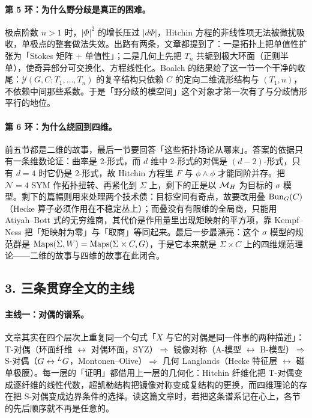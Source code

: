 \paragraph{第 5 环：为什么野分歧是真正的困难。}
极点阶数 $n>1$ 时，$|\Phi|^{2}$ 的增长压过 $|d\Phi|$，Hitchin 方程的非线性项无法被微扰吸收，单极点的整套做法失效。出路有两条，文章都提到了：一是拓扑上把单值性扩张为「Stokes 矩阵 $+$ 单值性」\cite{Wasow1965}；二是几何上先把 $T_{n}$ 共轭到极大环面（正则半单），使奇异部分可交换化、方程线性化\cite{BiquardBoalch2004}。Boalch 的结果给了这一节一个干净的收尾：$\mathcal{Y}(G,C;T_{1},\dots,T_{n})$ 的复辛结构只依赖 $C$ 的定向二维流形结构与 $(T_{1},n)$，不依赖中间那些系数\cite{Boalch2001}。于是「野分歧的模空间」这个对象才第一次有了与分歧情形平行的地位。

\paragraph{第 6 环：为什么绕回到四维。}
前五节都是二维的故事，最后一节要回答「这些拓扑场论从哪来」。答案的依据只有一条维数论证：曲率是 2-形式，而 $d$ 维中 2-形式的对偶是 $(d-2)$-形式，只有 $d=4$ 时它仍是 2-形式，故 Hitchin 方程里 $F$ 与 $\phi\wedge\phi$ 才能同阶并存。把 $\mathcal{N}=4$ SYM 作拓扑扭转、再紧化到 $\Sigma$ 上，剩下的正是以 $\mathcal{M}_{H}$ 为目标的 $\sigma$ 模型。剩下的篇幅则用来处理两个技术债：目标空间有奇点，故要改用叠 $\mathrm{Bun}_{G}(C)$（Hecke 算子必须作用在不稳定丛上）；而叠没有有限维的全局商，只能用 Atiyah--Bott 式的无穷维商\cite{AtiyahBott1982}，其代价是作用量里出现矩映射的平方项，靠 Kempf--Ness 把「矩映射为零」与「取商」等同起来。最后一步最漂亮：这个 $\sigma$ 模型的规范群是 $\operatorname{Maps}(\Sigma,W)=\operatorname{Maps}(\Sigma\times C,G)$，于是它本来就是 $\Sigma\times C$ 上的四维规范理论——二维的故事与四维的故事在此闭合。

\subsection*{3. 三条贯穿全文的主线}

\paragraph{主线一：对偶的谱系。}
文章其实在四个层次上重复同一个句式「$X$ 与它的对偶是同一件事的两种描述」：T-对偶（环面纤维 $\leftrightarrow$ 对偶环面，SYZ）$\Rightarrow$ 镜像对称（A-模型 $\leftrightarrow$ B-模型）$\Rightarrow$ S-对偶（$G\leftrightarrow{}^{L}G$，Montonen--Olive\cite{MontonenOlive1977}）$\Rightarrow$ 几何 Langlands（Hecke 特征层 $\leftrightarrow$ 磁单极膜）。每一层的「证明」都借用上一层的几何化：Hitchin 纤维化把 T-对偶变成逐纤维的线性代数，超凯勒结构把镜像对称变成复结构的更换，而四维理论的存在把 S-对偶变成边界条件的选择。读这篇文章时，若把这条谱系记在心上，各节的先后顺序就不再是任意的。

